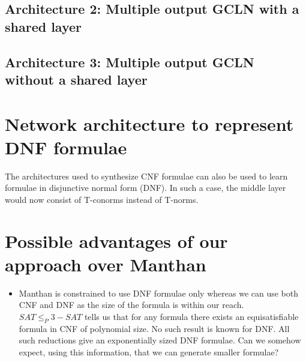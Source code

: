 \subsection{Architecture 2: Multiple output GCLN with a shared layer}

\subsection{Architecture 3: Multiple output GCLN without a shared layer}

\section{Network architecture to represent DNF formulae}

The architectures used to synthesize CNF formulae can also be used to learn formulae in disjunctive normal form (DNF).  In such a case, the middle layer would now consist of T-conorms instead of T-norms.

\section{Possible advantages of our approach over Manthan}
\begin{itemize}
\item Manthan is constrained to use DNF formulae only whereas we can use both CNF and DNF as the size of the formula is within our reach.  $SAT \leq_P 3-SAT$ tells us that for any formula there exists an equisatisfiable formula in CNF of polynomial size.  No  such result is known for DNF.  All such reductions give an exponentially sized DNF formulae. Can we somehow expect, using this information, that we can generate smaller formulae?

\end{itemize}